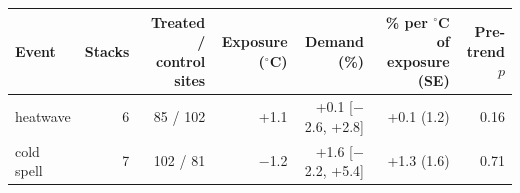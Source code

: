 \begin{tabular}{lrrrrrr}
\toprule
Event & Stacks & Treated / control sites & Exposure ($^\circ$C) & Demand (\%) & \% per $^\circ$C of exposure (SE) & Pre-trend $p$ \\
\midrule
heatwave & 6 & 85 / 102 & +1.1 & +0.1 [$-$2.6, +2.8] & +0.1 (1.2) & 0.16 \\
cold spell & 7 & 102 / 81 & $-$1.2 & +1.6 [$-$2.2, +5.4] & +1.3 (1.6) & 0.71 \\
\bottomrule
\end{tabular}
